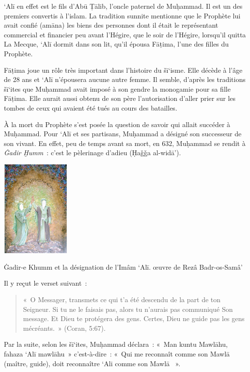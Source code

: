 `Alī en effet est le fils d'Abū Ṭālib, l'oncle paternel de Muḥammad. Il
est un des premiers convertis à l'islam. La tradition sunnite mentionne
que le Prophète lui avait confié (amāna) les biens des personnes dont il
était le représentant commercial et financier peu avant l'Hégire, que le
soir de l'Hégire, lorsqu'il quitta La Mecque, `Alī dormit dans son lit,
qu'il épousa Fāṭima, l'une des filles du Prophète.

Fāṭima joue un rôle très important dans l'histoire du šī`isme. Elle
décède à l'âge de 28 ans et `Alī n'épousera aucune autre femme. Il
semble, d'après les traditions šī`ites que Muḥammad avait imposé à son
gendre la monogamie pour sa fille Fāṭima. Elle aurait aussi obtenu de
son père l'autorisation d'aller prier sur les tombes de ceux qui avaient
été tués au cours des batailles.

À la mort du Prophète s'est posée la question de savoir qui allait
succéder à Muḥammad. Pour `Alī et ses partisans, Muḥammad a désigné son
successeur de son vivant. En effet, peu de temps avant sa mort, en 632,
Muḥammad se rendit à \emph{Ġadir Ḫumm~}: c'est le pèlerinage d'adieu (Ḥaǧǧa
al-widā').
\begin{marginfigure}
    \centering
    \includegraphics[width=1.35188in,height=1.90972in]{Images/image078.png}
    \caption{Ġadir-e Khumm et la
désignation de l'Imâm `Alī. œuvre de Rezâ
Badr-os-Samâ'}
    \label{Ġadir-e Khumm}
\end{marginfigure}

Il y reçut le verset suivant~: 
\begin{quote}
  {«~O Messager, transmets
ce qui t'a été descendu de la part de ton Seigneur. Si tu ne le faisais
pas, alors tu n'aurais pas communiqué Son message. Et Dieu te protégera
des gens. Certes, Dieu ne guide pas les gens mécréants.~» (Coran,
5:67).}  
\end{quote}


Par la suite, selon les šī`ites, Muḥammad déclara~: «~Man kuntu Mawlāhu,
fahaza `Alī mawlāhu~» c'est-à-dire~: «~Qui me reconnaît comme son Mawlā
(maître, guide), doit reconnaître `Ali comme son Mawlā ~».




